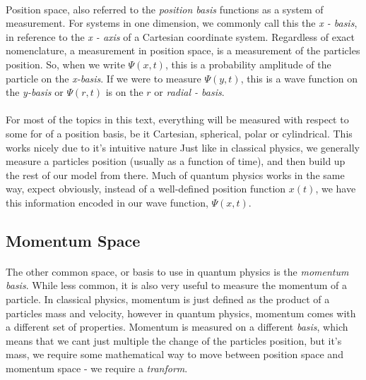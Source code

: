 \documentclass[12pt,letterpaper]{book}
\begin{document}
\paragraph*{}Position space, also referred to the \textit{position basis} functions as a system of measurement. For systems in one dimension, we commonly call this the \textit{x - basis}, in reference to the \textit{x - axis} of a Cartesian coordinate system. Regardless of exact nomenclature, a measurement in position space, is a measurement of the particles position. So, when we write $\Psi(x,t)$, this is a probability amplitude of the particle on the \textit{x-basis}. If we were to measure $\Psi(y,t)$, this is a wave function on the \textit{y-basis} or $\Psi(r,t)$ is on the $r$ or \textit{radial - basis}.
\paragraph*{}For most of the topics in this text, everything will be measured with respect to some for of a position basis, be it Cartesian, spherical, polar or cylindrical. This works nicely due to it's intuitive nature Just like in classical physics, we generally measure a particles position (usually as a function of time), and then build up the rest of our model from there. Much of quantum physics works in the same way, expect obviously, instead of a well-defined position function $x(t)$, we have this information encoded in our wave function,
$\Psi(x,t)$.


\subsection*{Momentum Space}
\paragraph*{}The other common space, or basis to use in quantum physics is the \textit{momentum basis}. While less common, it is also very useful to measure the momentum of a particle. In classical physics, momentum is just defined as the product of a particles mass and velocity,  however in quantum physics, momentum comes with a different set of properties. Momentum is measured on a different \textit{basis}, which means that we cant just multiple the change of the particles position, but it's mass, we require some mathematical way to move between position space and momentum space - we require a \textit{tranform}.
\end{document}
